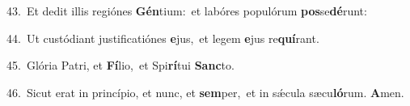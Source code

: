 {\numbfont\textcolor{\numbcolor}{43.}}~Et dedit illis regiónes \textbf{Gén}\-tium:~\star et labóres populórum \textbf{pos}\-se\-\textbf{dé}\-runt:\par
{\numbfont\textcolor{\numbcolor}{44.}}~Ut custódiant justificatiónes \textbf{e}\-jus,~\star et legem \textbf{e}\-jus re\-\textbf{quí}\-rant.\par
{\numbfont\textcolor{\numbcolor}{45.}}~Glória Patri, et \textbf{Fí}\-lio,~\star et Spi\-\textbf{rí}\-tui \textbf{Sanc}\-to.\par
{\numbfont\textcolor{\numbcolor}{46.}}~Sicut erat in princípio, et nunc, et \textbf{sem}\-per,~\star et in sǽcula sæcu\-\textbf{ló}\-rum. \textbf{A}\-men.\par
